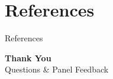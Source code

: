 \documentclass[aspectratio=169, 11pt]{beamer}
\begin{document}
\section{References}
\begin{frame}[allowframebreaks]{References}
    \footnotesize
    \nocite{*}
    
    
\end{frame}

\begin{frame}
    \centering
    {\Huge \textbf{\textcolor{amritaMaroon}{Thank You}}}\\[0.6cm]
    {\footnotesize \textcolor{amritaSlate}{Questions \& Panel Feedback}}
\end{frame}
\end{document}
